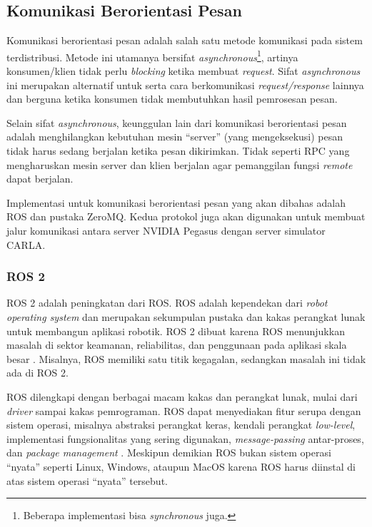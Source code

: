 \subsection{Komunikasi Berorientasi Pesan}

Komunikasi berorientasi pesan adalah salah satu metode komunikasi pada sistem
terdistribusi. Metode ini utamanya bersifat
\textit{asynchronous}\footnote{Beberapa implementasi bisa \textit{synchronous}
    juga.}, artinya konsumen/klien tidak perlu \textit{blocking} ketika membuat
\textit{request}. Sifat \textit{asynchronous} ini merupakan alternatif untuk
serta cara berkomunikasi \textit{request/response} lainnya dan berguna ketika
konsumen tidak membutuhkan hasil pemrosesan pesan.

Selain sifat \textit{asynchronous}, keunggulan lain dari komunikasi berorientasi
pesan ada\-lah menghilangkan kebutuhan mesin ``server'' (yang mengeksekusi) pesan
tidak harus sedang berjalan ketika pesan dikirimkan. Tidak seperti RPC yang
mengharuskan mesin server dan klien berjalan agar pemanggilan fungsi
\textit{remote} dapat berjalan.

Implementasi untuk komunikasi berorientasi pesan yang akan dibahas adalah ROS
dan pustaka ZeroMQ. Kedua protokol juga akan digunakan untuk membuat jalur
komunikasi antara server NVIDIA Pegasus dengan server simulator CARLA.

\subsubsection{ROS 2}

ROS 2 adalah peningkatan dari ROS. ROS adalah kependekan dari \textit{robot
    operating system} dan merupakan sekumpulan pustaka dan kakas perangkat lunak
untuk membangun aplikasi robotik. ROS 2 dibuat karena ROS menunjukkan masalah di
sektor keamanan, reliabilitas, dan penggunaan pada aplikasi skala besar
\parencite{doi:10.1126/scirobotics.abm6074_ros}. Misalnya, ROS memiliki satu
titik kegagalan, sedangkan masalah ini tidak ada di ROS 2.

ROS dilengkapi dengan berbagai macam kakas dan perangkat lunak, mulai dari
\textit{driver} sampai kakas pemrograman. ROS dapat menyediakan fitur serupa
dengan sistem operasi, misalnya abstraksi perangkat keras, kendali perangkat
\textit{low-level}, implementasi fungsionalitas yang sering digunakan,
\textit{message-passing} antar-proses, dan \textit{package management}
\parencite{x_rosIntro}.  Meskipun demikian ROS bukan sistem operasi ``nyata''
seperti Linux, Windows, ataupun MacOS karena ROS harus diinstal di atas sistem
operasi ``nyata'' tersebut.

